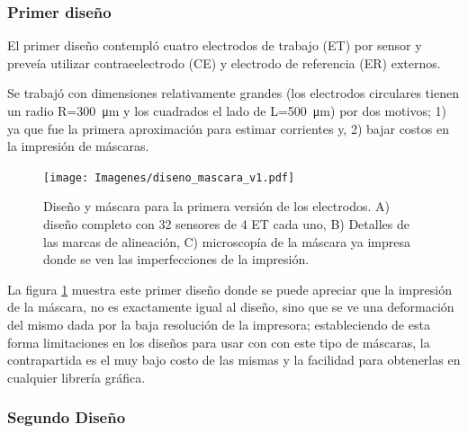 		 \subsubsection{Primer diseño}

		 El primer diseño contempló cuatro electrodos de trabajo (ET) por sensor y preveía utilizar contraeelectrodo (CE) y electrodo de referencia (ER) externos. 

		 Se trabajó con dimensiones relativamente grandes (los electrodos circulares tienen un radio R=\SI{300}{\um} y los cuadrados el lado de L=\SI{500}{\um}) por dos motivos; 1) ya que fue la primera aproximación para estimar corrientes y, 2) bajar costos en la impresión de máscaras.
		
				\begin{figure}[th!]
		 	       	\texttt{[image: Imagenes/diseno\_mascara\_v1.pdf]}
 		       		\caption[Primer diseño y máscara de los sensores]{Diseño y máscara para la primera versión de los electrodos. A) diseño completo con 32 sensores de 4 ET cada uno, B) Detalles de las marcas de alineación, C) microscopía de la máscara ya impresa donde se ven las imperfecciones de la impresión.}
 		         	\label{fig:diseno_mascara_v1}
 		     		\end{figure}
		
		 La figura \ref{fig:diseno_mascara_v1} muestra este primer diseño donde se puede apreciar que la impresión de la máscara, no es exactamente igual al diseño, sino que se ve una deformación del mismo dada por la baja resolución de la impresora; estableciendo de esta forma limitaciones en los diseños para usar con con este tipo de máscaras, la contrapartida es el muy bajo costo de las mismas y la facilidad para obtenerlas en cualquier librería gráfica.
		
 		 \subsubsection{Segundo Diseño}

